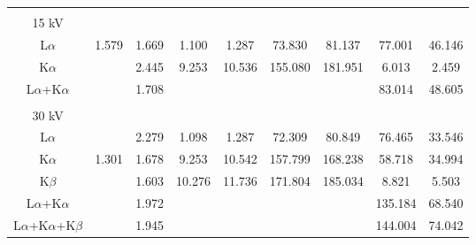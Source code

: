 \begin{table}[ht]
\begin{tabular}{ccccccccc}
        \hline
                                     &       &       &           &           &         &         &         &        \\
        15 kV                        &       &       &           &           &         &         &         &        \\
        L$\alpha$                    & 1.579 & 1.669 & 1.100     & 1.287     & 73.830  & 81.137  & 77.001  & 46.146 \\
        K$\alpha$                    &       & 2.445 & 9.253     & 10.536    & 155.080 & 181.951 & 6.013   & 2.459  \\
        L$\alpha$+K$\alpha$          &       & 1.708 &           &           &         &         & 83.014  & 48.605 \\

        \hline
                                     &       &       &           &           &         &         &         &        \\
        30 kV                        &       &       &           &           &         &         &         &        \\
        L$\alpha$                    &       & 2.279 & 1.098     & 1.287     & 72.309  & 80.849  & 76.465  & 33.546 \\
        K$\alpha$                    & 1.301 & 1.678 & 9.253     & 10.542    & 157.799 & 168.238 & 58.718  & 34.994 \\
        K$\beta$                     &       & 1.603 & 10.276    & 11.736    & 171.804 & 185.034 & 8.821   & 5.503  \\
        L$\alpha$+K$\alpha$          &       & 1.972 &           &           &         &         & 135.184 & 68.540 \\
        L$\alpha$+K$\alpha$+K$\beta$ &       & 1.945 &           &           &         &         & 144.004 & 74.042
    \end{tabular}
\end{table}
